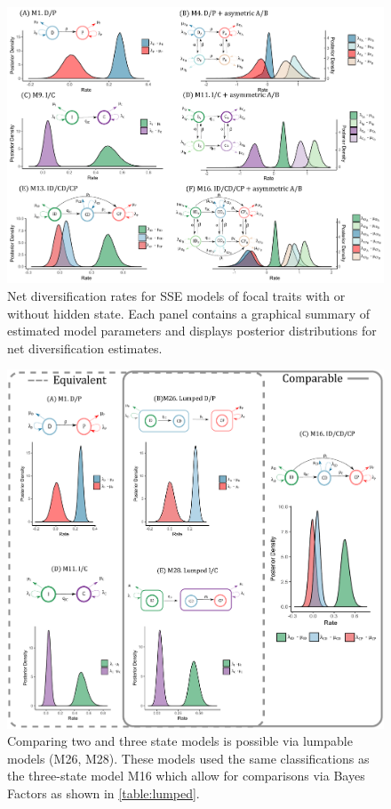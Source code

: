 \begin{figure}
\includegraphics[width=\textwidth]{alldiversificationasymhidden.pdf} 
\caption{Net diversification rates for SSE models of focal traits with or without hidden state. 
Each panel contains a graphical summary of estimated model parameters and displays posterior distributions for net diversification estimates.}
\label{figure:netdivall}
\end{figure}

\begin{figure}
\includegraphics[width=\textwidth]{lumped.pdf} %
\caption{Comparing two and three state models is possible via lumpable models (M26, M28). These models used the same classifications as the three-state model M16 which allow for comparisons via Bayes Factors as shown in \cref{table:lumped}.}  
\label{figure:lumped}
\end{figure}

